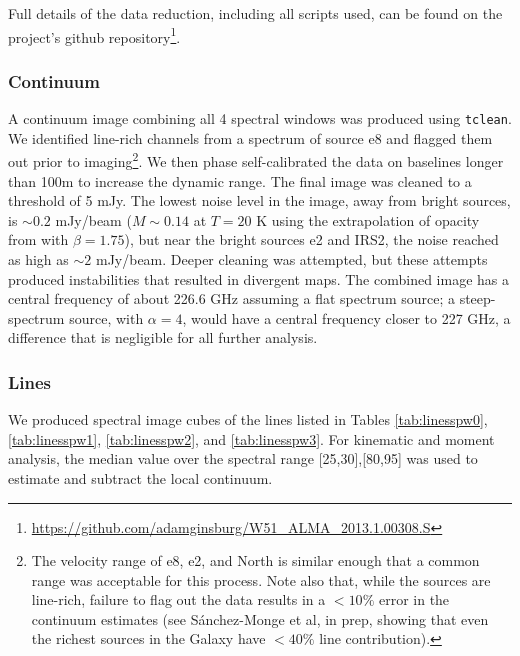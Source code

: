 \documentclass[twocolumn]{aastex61}
\begin{document}
Full details of the data reduction, including all scripts used, can be found on
the project's github
repository\footnote{\url{https://github.com/adamginsburg/W51_ALMA_2013.1.00308.S}}.


\subsubsection{Continuum}
A continuum image combining all 4 spectral windows was produced using
\texttt{tclean}.  We identified line-rich channels from a spectrum of source e8
and flagged them out prior to imaging\footnote{The velocity
range of e8, e2, and North is similar enough that a common range was acceptable
for this process.  Note also that, while the sources are line-rich,
failure to flag out the data results in a $<10\%$ error in the continuum estimates
(see S{\'a}nchez-Monge et al, in prep, showing that even the richest
sources in the Galaxy have $<40\%$ line contribution).}.  We then phase
self-calibrated the data on baselines longer than 100m to increase the dynamic
range.  The final image
was cleaned to a threshold of 5 mJy.  The lowest noise
level in the image, away from bright sources, is $\sim0.2$ mJy/beam
($M\sim0.14$ \msun at $T=20$ K using the extrapolation of
\citet{Ossenkopf1994a} opacity from \citet{Aguirre2011a} with $\beta=1.75$),
but near the bright sources e2 and IRS2, the noise reached as high as $\sim2$
mJy/beam.  Deeper cleaning was attempted, but these attempts produced
instabilities that resulted in divergent maps.  The combined image has a central
frequency of about 226.6 GHz assuming a flat spectrum source; a steep-spectrum
source, with $\alpha=4$, would have a central frequency closer to 227 GHz, a
difference that is negligible for all further analysis.


\subsubsection{Lines}
\label{sec:obslines}
We produced spectral image cubes of the lines listed in Tables
\ref{tab:linesspw0}, \ref{tab:linesspw1}, \ref{tab:linesspw2}, and
\ref{tab:linesspw3}.  For kinematic and moment analysis, the median value over
the spectral range [25,30],[80,95] \kms was used to estimate and subtract the
local continuum. 
\end{document}
